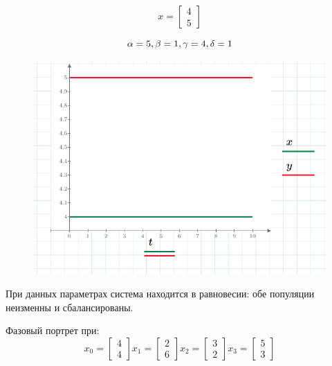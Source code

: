 \documentclass[a4paper, 14pt]{extarticle}
\begin{document}
		\noindent \[ x = \begin{bmatrix}
			4 \\ 5
		\end{bmatrix} \]
		
		\noindent\[
		\alpha = 5,\\
		\beta = 1,\\
		\gamma = 4,\\
		\delta = 1
		\]
		\begin{figure}[H]
			\centering
			\includegraphics[width = \linewidth]{7.pdf}
			\caption[.] {}
		\end{figure}
		При данных параметрах система находится в равновесии: обе популяции неизменны и сбалансированы.
		\pagebreak
		
		Фазовый портрет при:
		\noindent \[
					x_0 = \begin{bmatrix} 4 \\ 4 \end{bmatrix}
					x_1 = \begin{bmatrix} 2 \\ 6 \end{bmatrix} 
					x_2 = \begin{bmatrix} 3 \\ 2 \end{bmatrix} 
					x_3 = \begin{bmatrix} 5 \\ 3 \end{bmatrix} 
					\]
		
\end{document}
